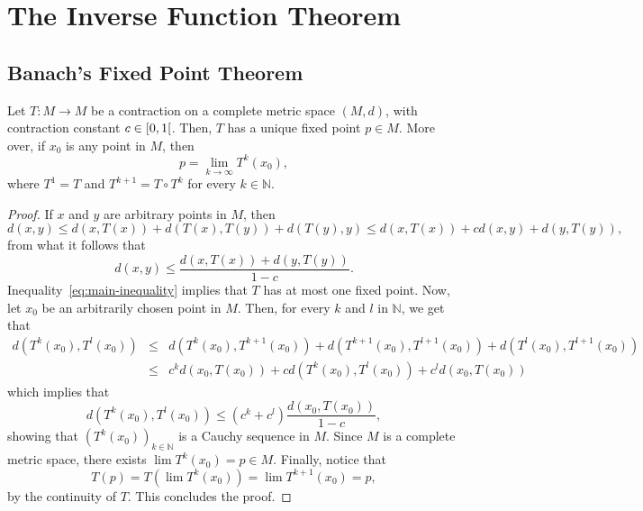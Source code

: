 \chapter{The Inverse Function Theorem}\label{chp:the_inverse_function_theorem}

\section{Banach's Fixed Point Theorem}\label{sec:banach_s_fixed_point_theorem}

\begin{theorem}\label{thm:banach's fixed point theorem}
	Let \(T:{M}\to{M}\) be a contraction on a complete metric space \((M,d)\),
	with contraction constant \({c}\in{\rinterval{0}{1}}\). Then, \(T\) has a
	unique fixed point \({p}\in{M}\). More over, if \(x_{0}\) is any point in
	\(M\), then \[p=\lim_{k\to\infty}T^{k}(x_{0}),\] where \(T^{1}=T\) and
	\(T^{k+1}=T\circ{T^{k}}\) for every \({k}\in{\mathbb{N}}\).
\end{theorem}

\begin{proof}
	If \(x\) and \(y\) are arbitrary points in \(M\), then
	\[
		d(x,y)
		\leqslant
		d(x,T(x)) + d(T(x),T(y)) + d(T(y),y)
		\leqslant
		d(x,T(x)) + cd(x,y) + d(y,T(y)),
	\]
	from what it follows that
	\begin{equation}\label{eq:main-inequality}
		d(x,y)
		\leqslant
		\frac{d(x,T(x)) + d(y,T(y))}{1 - c}.
	\end{equation}
  Inequality~\eqref{eq:main-inequality} implies that \(T\) has at most one
  fixed point. Now, let \(x_{0}\) be an arbitrarily chosen point in \(M\).
  Then, for every \(k\) and \(l\) in \(\mathbb{N}\), we get that
	\[
		\begin{array}{rcl}
			d(T^{k}(x_{0}),T^{l}(x_{0}))
			 & \leqslant &
			d(T^{k}(x_{0}),T^{k+1}(x_{0}))
			+
			d(T^{k+1}(x_{0}),T^{l+1}(x_{0}))
			+
			d(T^{l}(x_{0}),T^{l+1}(x_{0}))
			\\
			 & \leqslant &
			c^{k}d(x_{0},T(x_{0}))
			+
			cd(T^{k}(x_{0}),T^{l}(x_{0}))
			+
			c^{l}d(x_{0},T(x_{0}))
		\end{array}
	\]
	which implies that
	\begin{equation}\label{eq:the-sequence-of-iterates-is-cauchy}
		d(T^{k}(x_{0}),T^{l}(x_{0}))
		\leqslant
		(c^{k}+c^{l})\frac{d(x_{0},T(x_{0}))}{1-c},
	\end{equation}
	showing that \(\left(T^{k}(x_{0})\right)_{{k}\in{\mathbb{N}}}\) is a Cauchy
	sequence in \(M\). Since \(M\) is a complete metric space, there exists
	\(\lim{T^{k}(x_{0})}=p\in{M}\). Finally, notice that
	\[
		T(p)=T(\lim{T^{k}(x_{0})})=\lim{T^{k+1}(x_{0})}=p,
	\]
	by the continuity of \(T\). This concludes the proof.
\end{proof}


